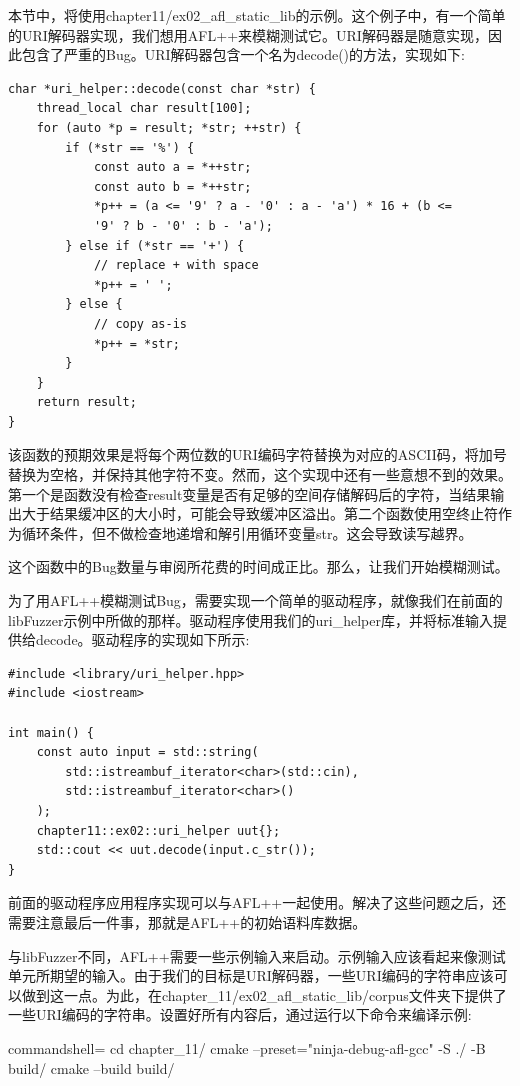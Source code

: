 本节中，将使用chapter11/ex02\_afl\_static\_lib的示例。这个例子中，有一个简单的URI解码器实现，我们想用AFL++来模糊测试它。URI解码器是随意实现，因此包含了严重的Bug。URI解码器包含一个名为decode()的方法，实现如下:

\begin{lstlisting}[style=styleCXX]
char *uri_helper::decode(const char *str) {
	thread_local char result[100];
	for (auto *p = result; *str; ++str) {
		if (*str == '%') {
			const auto a = *++str;
			const auto b = *++str;
			*p++ = (a <= '9' ? a - '0' : a - 'a') * 16 + (b <=
			'9' ? b - '0' : b - 'a');
		} else if (*str == '+') {
			// replace + with space
			*p++ = ' ';
		} else {
			// copy as-is
			*p++ = *str;
		}
	}
	return result;
}
\end{lstlisting}

该函数的预期效果是将每个两位数的URI编码字符替换为对应的ASCII码，将加号替换为空格，并保持其他字符不变。然而，这个实现中还有一些意想不到的效果。第一个是函数没有检查result变量是否有足够的空间存储解码后的字符，当结果输出大于结果缓冲区的大小时，可能会导致缓冲区溢出。第二个函数使用空终止符作为循环条件，但不做检查地递增和解引用循环变量str。这会导致读写越界。

这个函数中的Bug数量与审阅所花费的时间成正比。那么，让我们开始模糊测试。

为了用AFL++模糊测试Bug，需要实现一个简单的驱动程序，就像我们在前面的libFuzzer示例中所做的那样。驱动程序使用我们的uri\_helper库，并将标准输入提供给decode。驱动程序的实现如下所示:

\begin{lstlisting}[style=styleCXX]
#include <library/uri_helper.hpp>
#include <iostream>

int main() {
	const auto input = std::string(
		std::istreambuf_iterator<char>(std::cin),
		std::istreambuf_iterator<char>()
	);
	chapter11::ex02::uri_helper uut{};
	std::cout << uut.decode(input.c_str());
}
\end{lstlisting}

前面的驱动程序应用程序实现可以与AFL++一起使用。解决了这些问题之后，还需要注意最后一件事，那就是AFL++的初始语料库数据。

与libFuzzer不同，AFL++需要一些示例输入来启动。示例输入应该看起来像测试单元所期望的输入。由于我们的目标是URI解码器，一些URI编码的字符串应该可以做到这一点。为此，在chapter\_11/ex02\_afl\_static\_lib/corpus文件夹下提供了一些URI编码的字符串。设置好所有内容后，通过运行以下命令来编译示例:

\begin{tcblisting}{commandshell={}}
cd chapter_11/
cmake --preset="ninja-debug-afl-gcc" -S ./ -B build/
cmake --build build/
\end{tcblisting}

